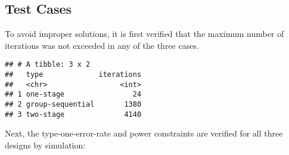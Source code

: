 \documentclass[]{book}
\newenvironment{Shaded}{\begin{snugshade}}{\end{snugshade}}
\newcommand{\DataTypeTok}[1]{\textcolor[rgb]{0.13,0.29,0.53}{#1}}
\newcommand{\KeywordTok}[1]{\textcolor[rgb]{0.13,0.29,0.53}{\textbf{#1}}}
\newcommand{\NormalTok}[1]{#1}
\newcommand{\OperatorTok}[1]{\textcolor[rgb]{0.81,0.36,0.00}{\textbf{#1}}}
\newcommand{\StringTok}[1]{\textcolor[rgb]{0.31,0.60,0.02}{#1}}
\begin{document}
\hypertarget{test-cases}{%
\subsection{Test Cases}\label{test-cases}}

To avoid improper solutions, it is first verified that the maximum
number of iterations was not exceeded in any of the three cases.

\begin{Shaded}
\end{Shaded}

\begin{verbatim}
## # A tibble: 3 x 2
##   type             iterations
##   <chr>                 <int>
## 1 one-stage                24
## 2 group-sequential       1380
## 3 two-stage              4140
\end{verbatim}

Next, the type-one-error-rate and power constraints are verified
for all three designs by simulation:
\end{document}
